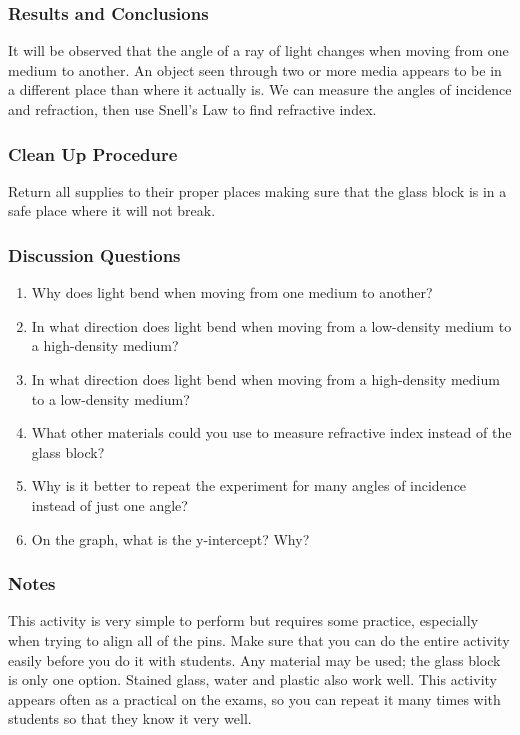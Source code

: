 \subsubsection*{Results and Conclusions}
It will be observed that the angle of a ray of light changes when moving from one medium to another.  An object seen through two or more media appears to be in a different place than where it actually is.  We can measure the angles of incidence and refraction, then use Snell's Law to find refractive index. 

\subsubsection*{Clean Up Procedure}
Return all supplies to their proper places making sure that the glass block is in a safe place where it will not break.

\subsubsection*{Discussion Questions}
\begin{enumerate}
\item{Why does light bend when moving from one medium to another?}
\item{In what direction does light bend when moving from a low-density medium to a high-density medium?}
\item{In what direction does light bend when moving from a high-density medium to a low-density medium?}
\item{What other materials could you use to measure refractive index instead of the glass block?}
\item{Why is it better to repeat the experiment for many angles of incidence instead of just one angle?}
\item{On the graph, what is the y-intercept? Why?}
\end{enumerate}

\subsubsection*{Notes}
This activity is very simple to perform but requires some practice, especially when trying to align all of the pins. Make sure that you can do the entire activity easily before you do it with students.  
Any material may be used; the glass block is only one option. Stained glass, water and plastic also work well.  
This activity appears often as a practical on the exams, so you can repeat it many times with students so that they know it very well.  



